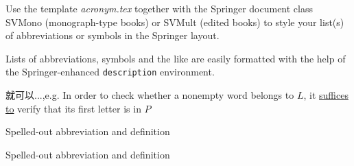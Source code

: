 %
%


Use the template \emph{acronym.tex} together with the Springer document class SVMono (monograph-type books) or SVMult (edited books) to style your list(s) of abbreviations or symbols in the Springer layout.

Lists of abbreviations, symbols and the like are easily formatted with the help of the Springer-enhanced \verb|description| environment.

\begin{description}[CABR]
\item[suffices to]{就可以...,e.g. In order to check whether
	a nonempty word belongs to $L$, it \underline{suffices to} verify that its first letter is in $P$}
\item[BABI]{Spelled-out abbreviation and definition}
\item[CABR]{Spelled-out abbreviation and definition}
\end{description}